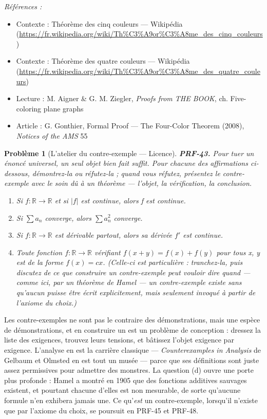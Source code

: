 \documentclass[11pt]{article}
\newtheorem{problem}{Problème}
\newenvironment{refs}{\par\small\noindent\emph{Références :}\begin{itemize}\setlength\itemsep{0pt}}{\end{itemize}\normalsize}
\begin{document}
\begin{refs}
\item Contexte : Théorème des cinq couleurs --- Wikipédia (\url{https://fr.wikipedia.org/wiki/Th%C3%A9or%C3%A8me_des_cinq_couleurs})
\item Contexte : Théorème des quatre couleurs --- Wikipédia (\url{https://fr.wikipedia.org/wiki/Th%C3%A9or%C3%A8me_des_quatre_couleurs})
\item Lecture : M. Aigner \& G. M. Ziegler, \textit{Proofs from THE BOOK}, ch. \og{} Five-coloring plane graphs \fg{}
\item Article : G. Gonthier, \og{} Formal Proof --- The Four-Color Theorem \fg{} (2008), \textit{Notices of the AMS} 55
\end{refs}

\bigskip

\begin{problem}[{L'atelier du contre-exemple --- Licence}]
\textbf{PRF-43.} Pour tuer un énoncé universel, un seul objet bien fait suffit. Pour
chacune des affirmations ci-dessous, démontrez-la ou réfutez-la ; quand vous réfutez,
présentez le contre-exemple avec le soin dû à un théorème --- l'objet, la vérification, la
conclusion.
\begin{enumerate}
\item[(a)] Si $ f\colon \mathbb{R} \to \mathbb{R} $ et si $ |f| $ est continue, alors f est
continue.
\item[(b)] Si $ \sum a_n $ converge, alors $ \sum a_n^2 $ converge.
\item[(c)] Si $ f\colon \mathbb{R} \to \mathbb{R} $ est dérivable partout, alors sa dérivée
$ f' $ est continue.
\item[(d)] Toute fonction $ f\colon \mathbb{R} \to \mathbb{R} $ vérifiant
$ f(x+y) = f(x) + f(y) $ pour tous x, y est de la forme $ f(x) = cx $. (Celle-ci est
particulière : tranchez-la, puis discutez de ce que \og{} construire un contre-exemple \fg{} peut
vouloir dire quand --- comme ici, par un théorème de Hamel --- un contre-exemple existe sans
qu'aucun puisse être écrit explicitement, mais seulement invoqué à partir de l'axiome du
choix.)
\end{enumerate}

\end{problem}

\noindent Les contre-exemples ne sont pas le contraire des démonstrations, mais une
espèce de démonstrations, et en construire un est un problème de conception : dressez la
liste des exigences, trouvez leurs tensions, et bâtissez l'objet exigence par exigence.
L'analyse en est la carrière classique --- \textit{Counterexamples in Analysis} de Gelbaum et
Olmsted en est tout un musée --- parce que ses définitions sont juste assez permissives pour
admettre des monstres. La question (d) ouvre une porte plus profonde : Hamel a montré en 1905
que des fonctions additives sauvages existent, et pourtant chacune d'elles est non mesurable,
de sorte qu'aucune formule n'en exhibera jamais une. Ce qu'\textit{est} un contre-exemple,
lorsqu'il n'existe que par l'axiome du choix, se poursuit en PRF-45 et PRF-48.
\end{document}
